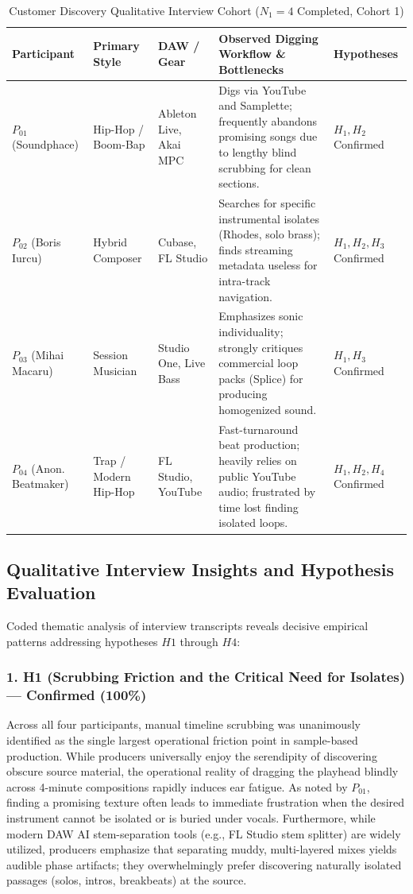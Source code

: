 \begin{table}[H]
    \centering
    \footnotesize
    \caption{Customer Discovery Qualitative Interview Cohort ($N_1 = 4$ Completed, Cohort 1)}
    \label{tab:interview_demographics}
    \begin{tabularx}{\textwidth}{|p{2.2cm}|p{2.3cm}|p{2.3cm}|X|p{2.2cm}|}
        \hline
        \textbf{Participant} & \textbf{Primary Style} & \textbf{DAW / Gear} & \textbf{Observed Digging Workflow \& Bottlenecks} & \textbf{Hypotheses} \\
        \hline
        $P_{01}$ (Soundphace) & Hip-Hop / Boom-Bap & Ableton Live, Akai MPC & Digs via YouTube and Samplette; frequently abandons promising songs due to lengthy blind scrubbing for clean sections. & $H_1, H_2$ Confirmed \\
        \hline
        $P_{02}$ (Boris Iurcu) & Hybrid Composer & Cubase, FL Studio & Searches for specific instrumental isolates (Rhodes, solo brass); finds streaming metadata useless for intra-track navigation. & $H_1, H_2, H_3$ Confirmed \\
        \hline
        $P_{03}$ (Mihai Macaru) & Session Musician & Studio One, Live Bass & Emphasizes sonic individuality; strongly critiques commercial loop packs (Splice) for producing homogenized sound. & $H_1, H_3$ Confirmed \\
        \hline
        $P_{04}$ (Anon. Beatmaker) & Trap / Modern Hip-Hop & FL Studio, YouTube & Fast-turnaround beat production; heavily relies on public YouTube audio; frustrated by time lost finding isolated loops. & $H_1, H_2, H_4$ Confirmed \\
        \hline
    \end{tabularx}
\end{table}

\subsection{Qualitative Interview Insights and Hypothesis Evaluation}
Coded thematic analysis of interview transcripts reveals decisive empirical patterns addressing hypotheses $H1$ through $H4$:

\subsubsection*{1. H1 (Scrubbing Friction and the Critical Need for Isolates) --- Confirmed (100\%)}
Across all four participants, manual timeline scrubbing was unanimously identified as the single largest operational friction point in sample-based production. While producers universally enjoy the serendipity of discovering obscure source material, the operational reality of dragging the playhead blindly across 4-minute compositions rapidly induces ear fatigue. As noted by $P_{01}$, finding a promising texture often leads to immediate frustration when the desired instrument cannot be isolated or is buried under vocals. Furthermore, while modern DAW AI stem-separation tools (e.g., FL Studio stem splitter) are widely utilized, producers emphasize that separating muddy, multi-layered mixes yields audible phase artifacts; they overwhelmingly prefer discovering naturally isolated passages (solos, intros, breakbeats) at the source.

